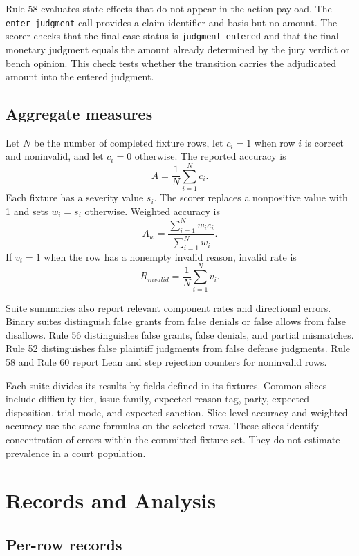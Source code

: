 \documentclass[11pt]{article}
\newcommand{\code}[1]{\texttt{#1}}
\begin{document}
Rule 58 evaluates state effects that do not appear in the action payload.  The \code{enter\_judgment} call provides a claim identifier and basis but no amount.  The scorer checks that the final case status is \code{judgment\_entered} and that the final monetary judgment equals the amount already determined by the jury verdict or bench opinion.  This check tests whether the transition carries the adjudicated amount into the entered judgment.

\subsection{Aggregate measures}

Let $N$ be the number of completed fixture rows, let $c_i=1$ when row $i$ is correct and noninvalid, and let $c_i=0$ otherwise.  The reported accuracy is
\[
  A=\frac{1}{N}\sum_{i=1}^{N}c_i.
\]
Each fixture has a severity value $s_i$.  The scorer replaces a nonpositive value with 1 and sets $w_i=s_i$ otherwise.  Weighted accuracy is
\[
  A_w=\frac{\sum_{i=1}^{N}w_i c_i}{\sum_{i=1}^{N}w_i}.
\]
If $v_i=1$ when the row has a nonempty invalid reason, invalid rate is
\[
  R_{invalid}=\frac{1}{N}\sum_{i=1}^{N}v_i.
\]

Suite summaries also report relevant component rates and directional errors.  Binary suites distinguish false grants from false denials or false allows from false disallows.  Rule 56 distinguishes false grants, false denials, and partial mismatches.  Rule 52 distinguishes false plaintiff judgments from false defense judgments.  Rule 58 and Rule 60 report Lean and step rejection counters for noninvalid rows.

Each suite divides its results by fields defined in its fixtures.  Common slices include difficulty tier, issue family, expected reason tag, party, expected disposition, trial mode, and expected sanction.  Slice-level accuracy and weighted accuracy use the same formulas on the selected rows.  These slices identify concentration of errors within the committed fixture set.  They do not estimate prevalence in a court population.

\section{Records and Analysis}

\subsection{Per-row records}
\end{document}
